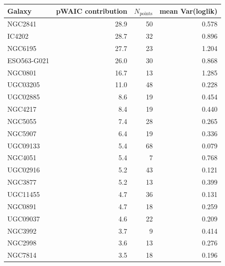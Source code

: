 \begin{tabular}{lrrr}
\toprule
Galaxy & pWAIC contribution & $N_{\mathrm{points}}$ & mean Var(loglik) \\
\midrule
NGC2841 & 28.9 & 50 & 0.578 \\
IC4202 & 28.7 & 32 & 0.896 \\
NGC6195 & 27.7 & 23 & 1.204 \\
ESO563-G021 & 26.0 & 30 & 0.868 \\
NGC0801 & 16.7 & 13 & 1.285 \\
UGC03205 & 11.0 & 48 & 0.228 \\
UGC02885 & 8.6 & 19 & 0.454 \\
NGC4217 & 8.4 & 19 & 0.440 \\
NGC5055 & 7.4 & 28 & 0.265 \\
NGC5907 & 6.4 & 19 & 0.336 \\
UGC09133 & 5.4 & 68 & 0.079 \\
NGC4051 & 5.4 & 7 & 0.768 \\
UGC02916 & 5.2 & 43 & 0.121 \\
NGC3877 & 5.2 & 13 & 0.399 \\
UGC11455 & 4.7 & 36 & 0.131 \\
NGC0891 & 4.7 & 18 & 0.259 \\
UGC09037 & 4.6 & 22 & 0.209 \\
NGC3992 & 3.7 & 9 & 0.414 \\
NGC2998 & 3.6 & 13 & 0.276 \\
NGC7814 & 3.5 & 18 & 0.196 \\
\bottomrule
\end{tabular}